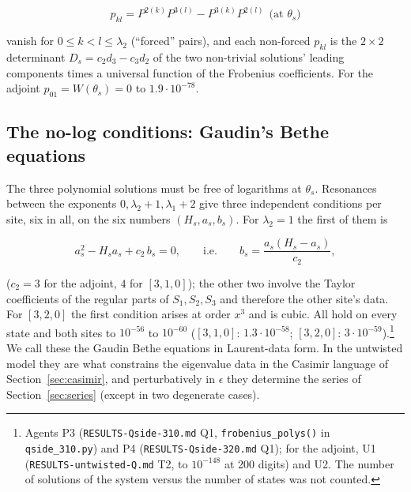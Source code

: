 \documentclass[11pt]{article}
\begin{document}
\begin{equation}
p_{kl}=P^{2(k)}P^{3(l)}-P^{3(k)}P^{2(l)}\ \ \text{(at }\theta_s)\label{eq:pluecker}
\end{equation}

vanish for $0\le k<l\le\lambda_2$ (``forced'' pairs), and each non-forced $p_{kl}$ is the $2\times2$ determinant $D_s=c_2d_3-c_3d_2$ of the two non-trivial solutions' leading components times a universal function of the Frobenius coefficients.
For the adjoint $p_{01}=W(\theta_s)=0$ to $1.9\cdot10^{-78}$.

\subsection{The no-log conditions: Gaudin's Bethe equations}\label{sec:nolog}

The three polynomial solutions must be free of logarithms at $\theta_s$. Resonances between the exponents $0,\lambda_2+1,\lambda_1+2$ give three independent conditions per site, six in all, on the six numbers $(H_s,a_s,b_s)$. For $\lambda_2=1$ the first of them is

\begin{equation}
a_s^2-H_sa_s+c_2\,b_s=0,\qquad\text{i.e.}\qquad b_s=\frac{a_s(H_s-a_s)}{c_2},\label{eq:nolog1}
\end{equation}

($c_2=3$ for the adjoint, $4$ for $[3,1,0]$); the other two involve the Taylor coefficients of the regular parts of $S_1,S_2,S_3$ and therefore the other site's data.
For $[3,2,0]$ the first condition arises at order $x^3$ and is cubic.
All hold on every state and both sites to $10^{-56}$ to $10^{-60}$ ($[3,1,0]$: $1.3\cdot10^{-58}$; $[3,2,0]$: $3\cdot10^{-59}$).\footnote{Agents P3 (\texttt{RESULTS-\allowbreak{}Qside-\allowbreak{}310.\allowbreak{}md} Q1, \texttt{frobenius\_\allowbreak{}polys()} in \texttt{qside\_\allowbreak{}310.\allowbreak{}py}) and P4 (\texttt{RESULTS-\allowbreak{}Qside-\allowbreak{}320.\allowbreak{}md} Q1); for the adjoint, U1 (\texttt{RESULTS-\allowbreak{}untwisted-\allowbreak{}Q.\allowbreak{}md} T2, to $10^{-148}$ at 200 digits) and U2.
The number of solutions of the system versus the number of states was not counted.} We call these the Gaudin Bethe equations in Laurent-data form.
In the untwisted model they are what constrains the eigenvalue data in the Casimir language of Section~\ref{sec:casimir}, and perturbatively in $\epsilon$ they determine the series of Section~\ref{sec:series} (except in two degenerate cases).
\end{document}

